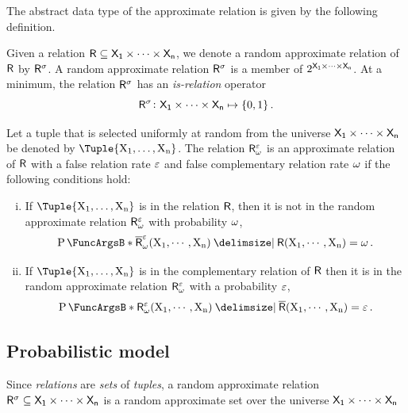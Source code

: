 \documentclass[11pt,final,hidelinks]{article}
\begin{document}
The abstract data type of the approximate relation is given by the following definition.
\begin{definition}
\label{def:approx_rel}
Given a relation $\Relation{R} \subseteq \Set{X}[1] \times \cdots \times 
\Set{X}[n]$, we denote a random approximate relation of $\Relation{R}$ by $\ARelation{R}$.
A random approximate relation $\ARelation{R}$ is a member of $\PS{\Set{X}[1] \times 
\cdots \times \Set{X}[n]}$.
At a minimum, the relation $\ARelation{R}$ has an \emph{is-relation} operator
\begin{equation}
    \ARelation{R} \colon \Set{X}[1] \times \cdots \times \Set{X}[n] \mapsto \{ 
    0, 1 \}\,.
\end{equation}

Let a tuple that is selected uniformly at random from the universe $\Set{X}[1] 
\times \cdots \times \Set{X}[n]$ be denoted by $\Tuple{\RV{X_1}, \ldots, 
\RV{X_n}}$.
The relation $\ARelation{R}[\fnrate][\fprate]$ is an approximate relation of $\Relation{R}$ 
with a false relation rate $\varepsilon$ and false complementary relation rate 
$\omega$ if the following conditions hold:
\begin{enumerate}[(i)]
    \item If $\Tuple{\RV{X_1}, \ldots, \RV{X_n}}$ is in the relation $\Relation{R}$, then it is not in the random approximate relation $\ARelation{R}[\fnrate][\fprate]$ with probability $\omega$,
    \begin{equation}
        \Prob{\AT{\SetComplement[\Relation{R}]}[\fnrate][\fprate](\RV{X_1}, \cdots, \RV{X_n}) \Given 
        \Relation{R}(\RV{X_1}, \cdots, \RV{X_n})} = \fnrate\,.
    \end{equation}
    
    \item If $\Tuple{\RV{X_1}, \ldots, \RV{X_n}}$ is in the complementary relation of $\Relation{R}$ then it is in the random approximate relation $\ARelation{R}[\fnrate][\fprate]$ with a probability $\varepsilon$,
    \begin{equation}
        \Prob{\ARelation{R}[\fnrate][\fprate](\RV{X_1}, \cdots, \RV{X_n}) \Given \SetComplement[\Relation{R}](\RV{X_1}, \cdots, \RV{X_n})} = \fprate\,.
    \end{equation}
\end{enumerate}
\end{definition}

\subsection{Probabilistic model}
\label{sec:prob_model}
Since \emph{relations} are \emph{sets} of \emph{tuples}, a random approximate relation $\ARelation{R} \subseteq \Set{X}[1] \times \cdots \times \Set{X}[n]$ is a random approximate set\cite{aset} over the universe $\Set{X}[1] \times \cdots \times \Set{X}[n]$
\end{document}
